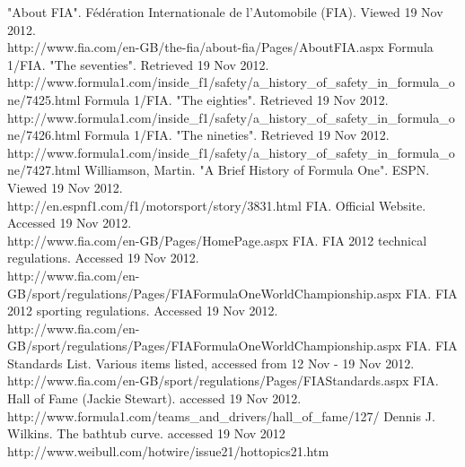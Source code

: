 \documentclass[12pt]{article} %
\begin{document}
\begin{thebibliography}{99} %

\bibitem
\newblock "About FIA". Fédération Internationale de l'Automobile (FIA). Viewed 19 Nov 2012.\\ http://www.fia.com/en-GB/the-fia/about-fia/Pages/AboutFIA.aspx
\bibitem
\newblock  Formula 1/FIA. "The seventies". Retrieved 19 Nov 2012.\\ http://www.formula1.com/inside\_f1/safety/a\_history\_of\_safety\_in\_formula\_one/7425.html
\bibitem
\newblock  Formula 1/FIA. "The eighties". Retrieved 19 Nov 2012.\\ http://www.formula1.com/inside\_f1/safety/a\_history\_of\_safety\_in\_formula\_one/7426.html
\bibitem
\newblock  Formula 1/FIA. "The nineties". Retrieved 19 Nov 2012. \\http://www.formula1.com/inside\_f1/safety/a\_history\_of\_safety\_in\_formula\_one/7427.html
\bibitem
\newblock Williamson, Martin. "A Brief History of Formula One". ESPN. Viewed 19 Nov 2012. \\http://en.espnf1.com/f1/motorsport/story/3831.html
\bibitem
\newblock FIA. Official Website. Accessed 19 Nov 2012.\\ http://www.fia.com/en-GB/Pages/HomePage.aspx
\bibitem 
\newblock FIA. FIA 2012 technical regulations. Accessed 19 Nov 2012.\\ http://www.fia.com/en-GB/sport/regulations/Pages/FIAFormulaOneWorldChampionship.aspx
\bibitem 
\newblock FIA. FIA 2012 sporting regulations. Accessed 19 Nov 2012.\\ http://www.fia.com/en-GB/sport/regulations/Pages/FIAFormulaOneWorldChampionship.aspx
\bibitem
\newblock FIA. FIA Standards List. Various items listed, accessed from 12 Nov - 19 Nov 2012.\\ http://www.fia.com/en-GB/sport/regulations/Pages/FIAStandards.aspx
\bibitem
\newblock FIA. Hall of Fame (Jackie Stewart). accessed 19 Nov 2012.\\ http://www.formula1.com/teams_and_drivers/hall_of_fame/127/
\bibitem
\newblock Dennis J. Wilkins. The bathtub curve. accessed 19 Nov 2012 \\ http://www.weibull.com/hotwire/issue21/hottopics21.htm
 

\end{thebibliography}
\newpage
\appendix
\end{document}

